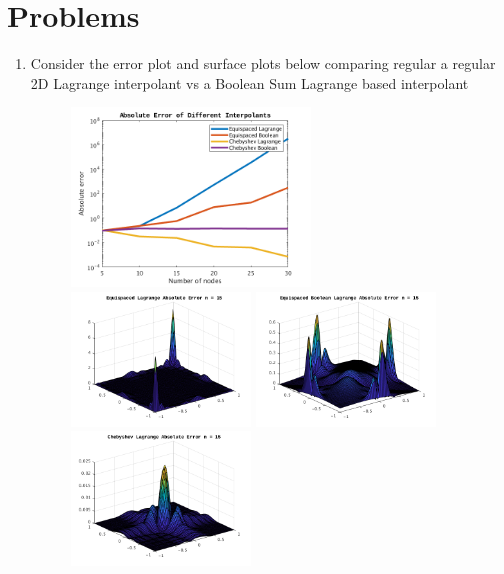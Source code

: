\documentclass[a4paper,12pt]{article}
\begin{document}
\section*{Problems}
\begin{enumerate}[label = \arabic*.]
	\item Consider the error plot and surface plots below comparing regular a regular 2D Lagrange interpolant vs a Boolean Sum Lagrange based interpolant
	\begin{figure}[h!]
		\centering
		\includegraphics[width = 0.6\textwidth]{images/Errors.png}
		\includegraphics[width = 0.45\textwidth]{images/EL15.png}
		\includegraphics[width = 0.45\textwidth]{images/EB15.png} \\
		\includegraphics[width = 0.45\textwidth]{images/CL15.png}

\end{figure}
\end{enumerate}
\end{document}
